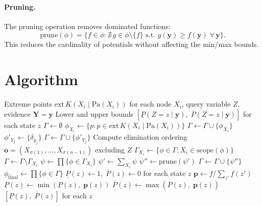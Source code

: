 \documentclass[11pt]{article}
\begin{document}
\paragraph{Pruning.}
The pruning operation removes dominated functions:
\[
  \mathrm{prune}(\phi) = \{f \in \phi : \nexists\, g \in \phi \setminus \{f\}
  \text{ s.t.\ } g(\mathbf{y}) \geq f(\mathbf{y})\; \forall\, \mathbf{y}\}.
\]
This reduces the cardinality of potentials without affecting the min/max bounds.

\section{Algorithm}

\begin{algorithm}[H]
\caption{Credal Variable Elimination (CVE)}
\label{alg:cve}
\begin{algorithmic}[1]
\Require Extreme points $\mathrm{ext}\,K(X_i \mid \mathrm{Pa}(X_i))$ for each node $X_i$,
         query variable $Z$, evidence $\mathbf{Y} = \mathbf{y}$
\Ensure Lower and upper bounds $[\underline{P}(Z{=}z \mid \mathbf{y}),\;
        \overline{P}(Z{=}z \mid \mathbf{y})]$ for each state $z$
\Statex
\State $\Gamma \gets \emptyset$
  \State $\phi_{X_i} \gets \{p : p \in \mathrm{ext}\,K(X_i \mid \mathrm{Pa}(X_i))\}$
  \State $\Gamma \gets \Gamma \cup \{\phi_{X_i}\}$
\EndFor
{}
  \State $\phi'_{Y_j} \gets \{\delta_{y_j}\}$
  \State $\Gamma \gets \Gamma \cup \{\phi'_{Y_j}\}$
\EndFor
\Statex
\State Compute elimination ordering $\mathbf{o} = (X_{\sigma(1)}, \dots, X_{\sigma(n-1)})$
       excluding $Z$
  \State $\Gamma_{X_i} \gets \{\phi \in \Gamma : X_i \in \mathrm{scope}(\phi)\}$
  \State $\Gamma \gets \Gamma \setminus \Gamma_{X_i}$
  \State $\psi \gets \prod \{\phi \in \Gamma_{X_i}\}$
  \State $\psi' \gets \sum_{X_i} \psi$
  \State $\psi'' \gets \mathrm{prune}(\psi')$
  \State $\Gamma \gets \Gamma \cup \{\psi''\}$
\EndFor
\Statex
\State $\phi_{\mathrm{final}} \gets \prod \{\phi \in \Gamma\}$
\State $\underline{P}(z) \gets 1,\; \overline{P}(z) \gets 0$ for each state $z$
  \State $\mathbf{p} \gets f / \sum_{z'} f(z')$
    \State $\underline{P}(z) \gets \min(\underline{P}(z),\; \mathbf{p}(z))$
    \State $\overline{P}(z) \gets \max(\overline{P}(z),\; \mathbf{p}(z))$
  \EndFor
\EndFor
\State \Return $[\underline{P}(z),\; \overline{P}(z)]$ for each $z$
\end{algorithmic}
\end{algorithm}
\end{document}
